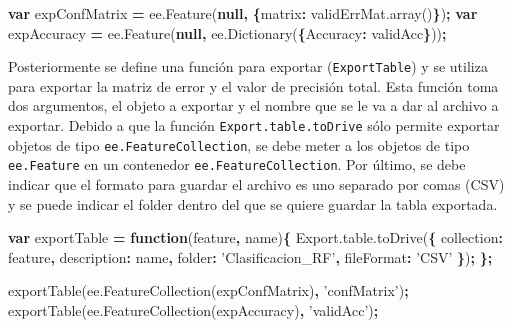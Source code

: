 \documentclass[
]{article}
\newenvironment{Shaded}{\begin{snugshade}}{\end{snugshade}}
\newcommand{\AttributeTok}[1]{\textcolor[rgb]{0.77,0.63,0.00}{#1}}
\newcommand{\DataTypeTok}[1]{\textcolor[rgb]{0.13,0.29,0.53}{#1}}
\newcommand{\KeywordTok}[1]{\textcolor[rgb]{0.13,0.29,0.53}{\textbf{#1}}}
\newcommand{\NormalTok}[1]{#1}
\newcommand{\OperatorTok}[1]{\textcolor[rgb]{0.81,0.36,0.00}{\textbf{#1}}}
\newcommand{\StringTok}[1]{\textcolor[rgb]{0.31,0.60,0.02}{#1}}
\newcommand{\VariableTok}[1]{\textcolor[rgb]{0.00,0.00,0.00}{#1}}
\begin{document}
\begin{Shaded}
\begin{Highlighting}[]
\KeywordTok{var}\NormalTok{ expConfMatrix }\OperatorTok{=}  \VariableTok{ee}\NormalTok{.}\AttributeTok{Feature}\NormalTok{(}\KeywordTok{null}\OperatorTok{,} \OperatorTok{\{}\DataTypeTok{matrix}\OperatorTok{:} \VariableTok{validErrMat}\NormalTok{.}\AttributeTok{array}\NormalTok{()}\OperatorTok{\}}\NormalTok{)}\OperatorTok{;}
\KeywordTok{var}\NormalTok{ expAccuracy }\OperatorTok{=} \VariableTok{ee}\NormalTok{.}\AttributeTok{Feature}\NormalTok{(}\KeywordTok{null}\OperatorTok{,} \VariableTok{ee}\NormalTok{.}\AttributeTok{Dictionary}\NormalTok{(}\OperatorTok{\{}\DataTypeTok{Accuracy}\OperatorTok{:}\NormalTok{ validAcc}\OperatorTok{\}}\NormalTok{))}\OperatorTok{;}
\end{Highlighting}
\end{Shaded}

Posteriormente se define una función para exportar
(\texttt{ExportTable}) y se utiliza para exportar la matriz de error y
el valor de precisión total. Esta función toma dos argumentos, el objeto
a exportar y el nombre que se le va a dar al archivo a exportar. Debido
a que la función \texttt{Export.table.toDrive} sólo permite exportar
objetos de tipo \texttt{ee.FeatureCollection}, se debe meter a los
objetos de tipo \texttt{ee.Feature} en un contenedor
\texttt{ee.FeatureCollection}. Por último, se debe indicar que el
formato para guardar el archivo es uno separado por comas (CSV) y se
puede indicar el folder dentro del que se quiere guardar la tabla
exportada.

\begin{Shaded}
\begin{Highlighting}[]
\KeywordTok{var}\NormalTok{ exportTable }\OperatorTok{=} \KeywordTok{function}\NormalTok{(feature}\OperatorTok{,}\NormalTok{ name)}\OperatorTok{\{}
  \VariableTok{Export}\NormalTok{.}\VariableTok{table}\NormalTok{.}\AttributeTok{toDrive}\NormalTok{(}\OperatorTok{\{}
    \DataTypeTok{collection}\OperatorTok{:}\NormalTok{ feature}\OperatorTok{,}
    \DataTypeTok{description}\OperatorTok{:}\NormalTok{ name}\OperatorTok{,}
    \DataTypeTok{folder}\OperatorTok{:} \StringTok{'Clasificacion_RF'}\OperatorTok{,}
    \DataTypeTok{fileFormat}\OperatorTok{:} \StringTok{'CSV'}
 \OperatorTok{\}}\NormalTok{)}\OperatorTok{;}
\OperatorTok{\};}

\AttributeTok{exportTable}\NormalTok{(}\VariableTok{ee}\NormalTok{.}\AttributeTok{FeatureCollection}\NormalTok{(expConfMatrix)}\OperatorTok{,} \StringTok{'confMatrix'}\NormalTok{)}\OperatorTok{;}
\AttributeTok{exportTable}\NormalTok{(}\VariableTok{ee}\NormalTok{.}\AttributeTok{FeatureCollection}\NormalTok{(expAccuracy)}\OperatorTok{,} \StringTok{'validAcc'}\NormalTok{)}\OperatorTok{;}
\end{Highlighting}
\end{Shaded}
\end{document}
